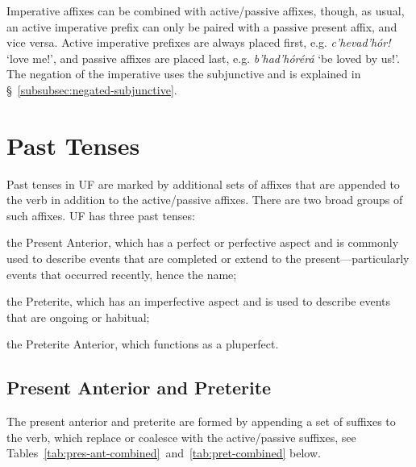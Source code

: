 \documentclass[a4paper, 12pt, twoside, openright, final]{book}
\let \w \textit
\begin{document}
Imperative affixes can be combined with active/passive affixes, though, as usual, an active imperative prefix
can only be paired with a passive present affix, and vice versa. Active imperative prefixes are always placed
first, e.g. \w{c’hevad’hór!} ‘love me!’, and passive affixes are placed last, e.g. \w{b’had’hórérá} ‘be loved by
us!’. The negation of the imperative uses the subjunctive and is explained in §~\ref{subsubsec:negated-subjunctive}.

\section{Past Tenses}\label{subsec:tense-and-aspect-marking}
Past tenses in UF are marked by additional sets of affixes that are appended to the verb in addition to the active/passive affixes.
There are two broad groups of such affixes. UF has three past tenses:
\begin{items}
\item the Present Anterior, which has a perfect or perfective aspect and is commonly used
      to describe events that are completed or extend to the present—particularly events that occurred recently, hence the name;
\item the Preterite, which has an imperfective aspect and is used to describe events that are ongoing or habitual;
\item the Preterite Anterior, which functions as a pluperfect.
\end{items}

\subsection{Present Anterior and Preterite}\label{subsubsec:suffixed-tenses}
The present anterior and preterite are formed by appending a set of suffixes to the verb, which replace or coalesce with the active/passive
suffixes, see Tables~\ref{tab:pres-ant-combined}~and~\ref{tab:pret-combined} below.
\end{document}
